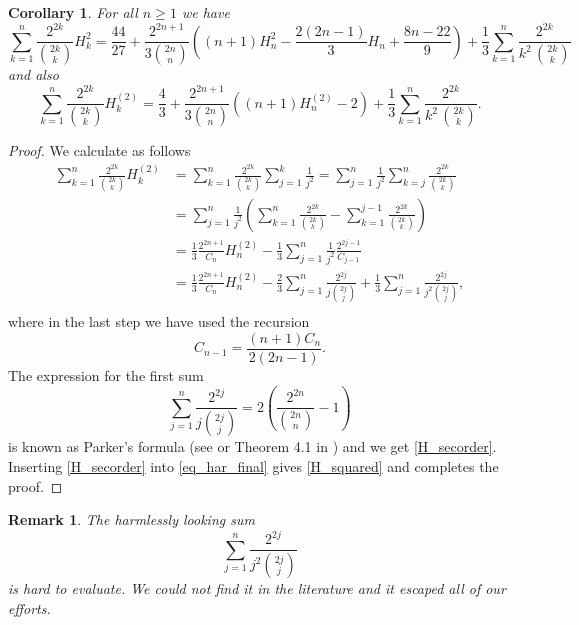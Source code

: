 \documentclass[11pt,reqno]{amsart}
\theoremstyle{plain}
\numberwithin{equation}{section}
\newtheorem{corollary}[thm]{Corollary}
\newtheorem{remark}[thm]{Remark}
\begin{document}
\begin{corollary}
For all $n\geq 1$ we have
\begin{equation}\label{H_squared}
\sum_{k=1}^n \frac{2^{2k}}{\binom{2k}{k}} H_{k}^2 = \frac{44}{27} + \frac{2^{2n+1}}{3 \binom{2n}{n}}\left ((n+1)H_{n}^2 
- \frac{2(2n-1)}{3}H_n + \frac{8n-22}{9} \right ) + \frac{1}{3} \sum_{k=1}^n \frac{2^{2k}}{k^2\,\binom{2k}{k}}
\end{equation}
and also
\begin{equation}\label{H_secorder}
\sum_{k=1}^n \frac{2^{2k}}{\binom{2k}{k}} H_{k}^{(2)} = \frac{4}{3} + \frac{2^{2n+1}}{3 \binom{2n}{n}}\left ((n+1)H_{n}^{(2)} - 2 \right ) 
+ \frac{1}{3} \sum_{k=1}^n \frac{2^{2k}}{k^2\,\binom{2k}{k}}.
\end{equation}
\end{corollary}
\begin{proof}
We calculate as follows
\begin{align*}
\sum_{k=1}^n \frac{2^{2k}}{\binom{2k}{k}} H_{k}^{(2)} &= \sum_{k=1}^n \frac{2^{2k}}{\binom{2k}{k}}\sum_{j=1}^k \frac{1}{j^2} 
= \sum_{j=1}^n \frac{1}{j^2} \sum_{k=j}^n \frac{2^{2k}}{\binom{2k}{k}} \\
&= \sum_{j=1}^n \frac{1}{j^2} \left (\sum_{k=1}^n \frac{2^{2k}}{\binom{2k}{k}} - \sum_{k=1}^{j-1} \frac{2^{2k}}{\binom{2k}{k}} \right ) \\
&= \frac{1}{3}\frac{2^{2n+1}}{C_n} H_n^{(2)} - \frac{1}{3}\sum_{j=1}^n \frac{1}{j^2} \frac{2^{2j-1}}{C_{j-1}} \\
&= \frac{1}{3}\frac{2^{2n+1}}{C_n} H_n^{(2)} - \frac{2}{3}\sum_{j=1}^n \frac{2^{2j}}{j \binom{2j}{j}} 
+ \frac{1}{3}\sum_{j=1}^n \frac{2^{2j}}{j^2 \binom{2j}{j}}, \\
\end{align*}
where in the last step we have used the recursion
$$C_{n-1}= \frac{(n+1)C_n}{2(2n-1)}.$$
The expression for the first sum
$$\sum_{j=1}^n \frac{2^{2j}}{j \binom{2j}{j}} = 2 \left (\frac{2^{2n}}{\binom{2n}{n}} - 1 \right )$$
is known as Parker's formula (see \cite{Witula} or Theorem 4.1 in \cite{Sprugnoli}) and we get \eqref{H_secorder}. 
Inserting \eqref{H_secorder} into \eqref{eq_har_final} gives \eqref{H_squared} and completes the proof.
\end{proof}

\begin{remark}
The harmlessly looking sum 
$$\sum_{j=1}^n \frac{2^{2j}}{j^2 \binom{2j}{j}}$$
is hard to evaluate. We could not find it in the literature and it escaped all of our efforts.
\end{remark}
\end{document}
